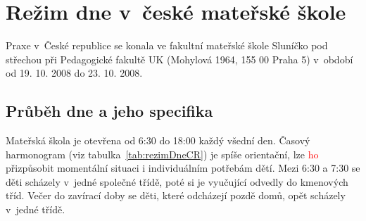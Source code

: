 

\section{Režim dne v~české mateřské škole}

		Praxe v~České republice se konala ve fakultní mateřské škole Sluníčko pod střechou při Pedagogické fakultě UK (Mohylová 1964, 155 00 Praha 5) v~období od 19. 10. 2008 do 23. 10. 2008. 

	\subsection{Průběh dne a jeho specifika}

			Mateřská škola je otevřena od 6:30 do 18:00 každý všední den. Časový harmonogram (viz tabulka~\ref{tab:rezimDneCR})
			je spíše orientační, lze \textcolor{red}{ho} přizpůsobit momentální situaci i individuálním potřebám dětí. Mezi 6:30 a 7:30 se děti scházely v~jedné společné třídě, poté si je vyučující odvedly do kmenových tříd. Večer do zavírací doby se děti, které odcházejí pozdě domů, opět scházely v~jedné třídě.

